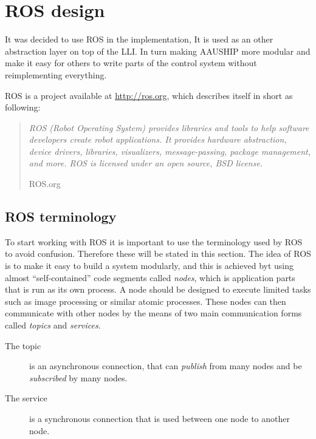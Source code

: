 \chapter{\acs{ROS} design}

It was decided to use \ac{ROS} in the implementation, It is used as
an other abstraction layer on top of the \ac{LLI}. In turn making
AAUSHIP more modular and make it easy for others to write parts of the
control system without reimplementing everything. 

\ac{ROS} is a project available at \url{http://ros.org}, which
describes itself in short as following:

\begin{quote}
\noindent	\textit{
	ROS (Robot Operating System) provides libraries and
	tools to help software developers create robot applications. It
	provides hardware abstraction, device drivers, libraries,
	visualizers, message-passing, package management, and more. ROS is
licensed under an open source, BSD license.}
		
	\hfill ROS.org
\end{quote}

\section{\acs{ROS} terminology}
To start working with \ac{ROS} it is important to use the terminology
used by \ac{ROS} to avoid confusion. Therefore these  will be stated
in this section.  The idea of \ac{ROS} is to make it easy to build a
system modularly, and this is achieved byt using almost
``self-contained'' code segments called \textit{nodes}, which is
application parts that is run as its own process. A node should be
designed to execute limited tasks such as image processing or similar
atomic processes. These nodes can then communicate with other nodes by
the means of two main communication forms called \textit{topics} and
\textit{services}.

\begin{description}
\item[The topic] is an asynchronous connection, that can \textit{publish}
from many nodes and be \textit{subscribed} by many nodes.
\item[The service] is a synchronous connection that is used between one node
to another node.
\end{description}

